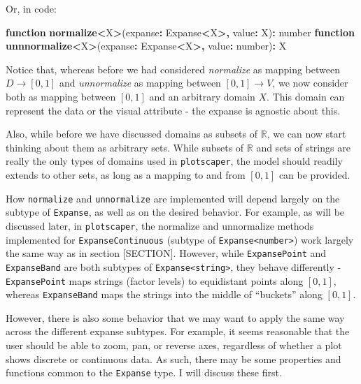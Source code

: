 \documentclass[
]{book}
\newenvironment{Shaded}{\begin{snugshade}}{\end{snugshade}}
\newcommand{\DataTypeTok}[1]{\textcolor[rgb]{0.13,0.29,0.53}{#1}}
\newcommand{\FunctionTok}[1]{\textcolor[rgb]{0.13,0.29,0.53}{\textbf{#1}}}
\newcommand{\KeywordTok}[1]{\textcolor[rgb]{0.13,0.29,0.53}{\textbf{#1}}}
\newcommand{\NormalTok}[1]{#1}
\newcommand{\OperatorTok}[1]{\textcolor[rgb]{0.81,0.36,0.00}{\textbf{#1}}}
\theoremstyle{definition}
\theoremstyle{definition}
\theoremstyle{definition}
\theoremstyle{definition}
\theoremstyle{remark}
\begin{document}
Or, in code:

\begin{Shaded}
\begin{Highlighting}[]
\KeywordTok{function} \FunctionTok{normalize}\OperatorTok{\textless{}}\NormalTok{X}\OperatorTok{\textgreater{}}\NormalTok{(expanse}\OperatorTok{:}\NormalTok{ Expanse}\OperatorTok{\textless{}}\NormalTok{X}\OperatorTok{\textgreater{},}\NormalTok{ value}\OperatorTok{:}\NormalTok{ X)}\OperatorTok{:} \DataTypeTok{number}
\KeywordTok{function} \FunctionTok{unnnormalize}\OperatorTok{\textless{}}\NormalTok{X}\OperatorTok{\textgreater{}}\NormalTok{(expanse}\OperatorTok{:}\NormalTok{ Expanse}\OperatorTok{\textless{}}\NormalTok{X}\OperatorTok{\textgreater{},}\NormalTok{ value}\OperatorTok{:} \DataTypeTok{number}\NormalTok{)}\OperatorTok{:}\NormalTok{ X}
\end{Highlighting}
\end{Shaded}

Notice that, whereas before we had considered \emph{normalize} as mapping between \(D \to [0, 1]\) and \emph{unnormalize} as mapping between \([0, 1] \to V\), we now consider both as mapping between \([0, 1]\) and an arbitrary domain \(X\). This domain can represent the data or the visual attribute - the expanse is agnostic about this.

Also, while before we have discussed domains as subsets of \(\mathbb{R}\), we can now start thinking about them as arbitrary sets. While subsets of \(\mathbb{R}\) and sets of strings are really the only types of domains used in \texttt{plotscaper}, the model should readily extends to other sets, as long as a mapping to and from \([0, 1]\) can be provided.

How \texttt{normalize} and \texttt{unnormalize} are implemented will depend largely on the subtype of \texttt{Expanse}, as well as on the desired behavior. For example, as will be discussed later, in \texttt{plotscaper}, the normalize and unnormalize methods implemented for \texttt{ExpanseContinuous} (subtype of \texttt{Expanse\textless{}number\textgreater{}}) work largely the same way as in section {[}SECTION{]}. However, while \texttt{ExpansePoint} and \texttt{ExpanseBand} are both subtypes of \texttt{Expanse\textless{}string\textgreater{}}, they behave differently - \texttt{ExpansePoint} maps strings (factor levels) to equidistant points along \([0, 1]\), whereas \texttt{ExpanseBand} maps the strings into the middle of ``buckets'' along \([0, 1]\).

However, there is also some behavior that we may want to apply the same way across the different expanse subtypes. For example, it seems reasonable that the user should be able to zoom, pan, or reverse axes, regardless of whether a plot shows discrete or continuous data. As such, there may be some properties and functions common to the \texttt{Expanse} type. I will discuss these first.
\end{document}
